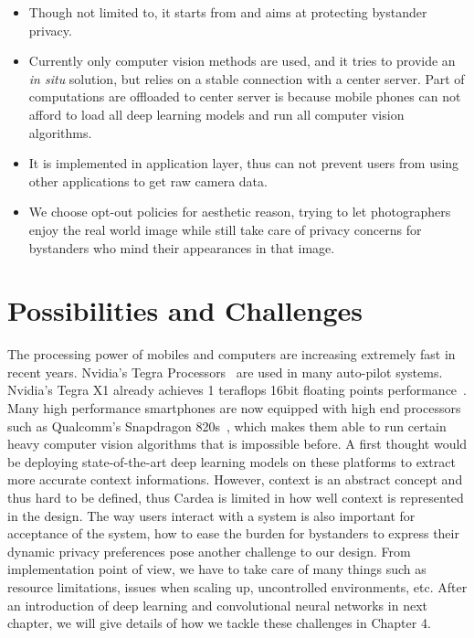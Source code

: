 \begin{itemize}
  \item Though not limited to, it starts from and aims at protecting bystander privacy.
  \item Currently only computer vision methods are used, and it tries to provide an \emph{in situ} solution, but relies on a stable connection with a center server. Part of computations are offloaded to center server is because mobile phones can not afford to load all deep learning models and run all computer vision algorithms.
  \item It is implemented in application layer, thus can not prevent users from using other applications to get raw camera data.
  \item We choose opt-out policies for aesthetic reason, trying to let photographers enjoy the real world image while still take care of privacy concerns for bystanders who mind their appearances in that image.
\end{itemize}

\section{Possibilities and Challenges}

The processing power of mobiles and computers are increasing extremely fast in recent years. Nvidia's Tegra Processors~\cite{links:Tegraproc} are used in many auto-pilot systems. Nvidia's Tegra X1 already achieves 1 teraflops 16bit floating points performance~\cite{links:Tegrax1}. Many high performance smartphones are now equipped with high end processors such as Qualcomm's Snapdragon 820s~\cite{links:Snapdragon820swiki}, which makes them able to run certain heavy computer vision algorithms that is impossible before. A first thought would be deploying state-of-the-art deep learning models on these platforms to extract more accurate context informations. However, context is an abstract concept and thus hard to be defined, thus Cardea is limited in how well context is represented in the design. The way users interact with a system is also important for acceptance of the system, how to ease the burden for bystanders to express their dynamic privacy preferences pose another challenge to our design. From implementation point of view, we have to take care of many things such as resource limitations, issues when scaling up, uncontrolled environments, etc. After an introduction of deep learning and convolutional neural networks in next chapter, we will give details of how we tackle these challenges in Chapter 4.




\newpage
